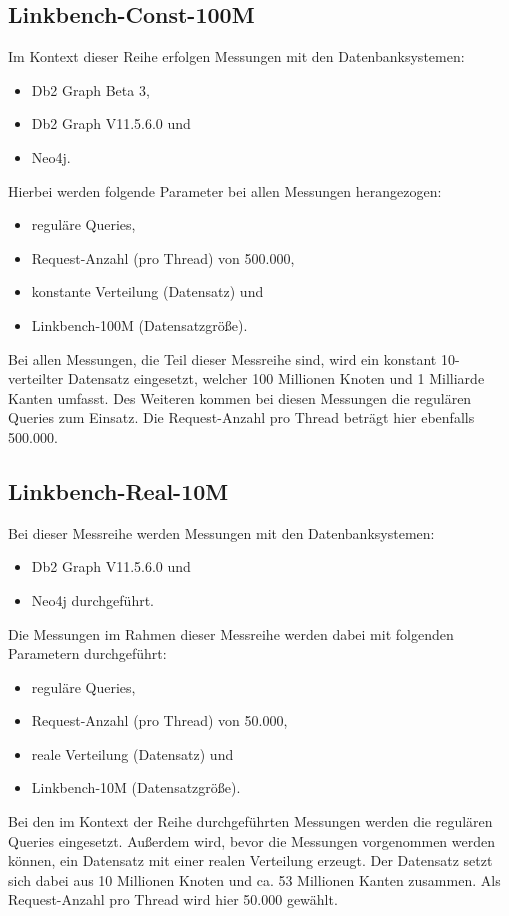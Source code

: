 \subsection{Linkbench-Const-100M}
Im Kontext dieser Reihe erfolgen Messungen mit den Datenbanksystemen:
\begin{itemize}
    \item Db2 Graph Beta 3,
    \item Db2 Graph V11.5.6.0 und 
    \item Neo4j. 
\end{itemize}

Hierbei werden folgende Parameter bei allen Messungen herangezogen:
\begin{itemize}
    \item reguläre Queries,
    \item Request-Anzahl (pro Thread) von 500.000, 
    \item konstante Verteilung (Datensatz) und
    \item Linkbench-100M (Datensatzgröße).
\end{itemize}
Bei allen Messungen, die Teil dieser Messreihe sind, wird ein konstant 10-verteilter Datensatz eingesetzt, welcher 100 Millionen Knoten und 1 Milliarde Kanten umfasst. Des Weiteren kommen bei diesen Messungen die regulären Queries zum Einsatz. Die Request-Anzahl pro Thread beträgt hier ebenfalls 500.000.

\subsection{Linkbench-Real-10M}
Bei dieser Messreihe werden Messungen mit den Datenbanksystemen:
\begin{itemize}
    \item Db2 Graph V11.5.6.0 und 
    \item Neo4j durchgeführt. 
\end{itemize}

Die Messungen im Rahmen dieser Messreihe werden dabei mit folgenden Parametern durchgeführt:
\begin{itemize}
    \item reguläre Queries,
    \item Request-Anzahl (pro Thread) von 50.000, 
    \item reale Verteilung (Datensatz) und 
    \item Linkbench-10M (Datensatzgröße).
\end{itemize}
Bei den im Kontext der Reihe durchgeführten Messungen werden die regulären Queries eingesetzt. Außerdem wird, bevor die Messungen vorgenommen werden können, ein Datensatz mit einer realen Verteilung erzeugt. Der Datensatz setzt sich dabei aus 10 Millionen Knoten und ca. 53 Millionen Kanten zusammen. Als Request-Anzahl pro Thread wird hier 50.000 gewählt. 

